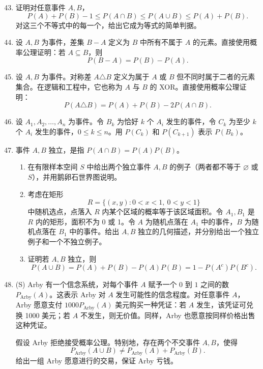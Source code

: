 \documentclass[UTF8,12pt,a4paper,fontset=fandol]{ctexart}
\begin{document}
\begin{enumerate}
  \setcounter{enumi}{42}
  \item 证明对任意事件 $A,B$，
  \[
    P(A)+P(B)-1\le P(A\cap B)\le P(A\cup B)\le P(A)+P(B).
  \]
  对这三个不等式中的每一个，给出它成为等式的简单判据。

  \item 设 $A,B$ 为事件，差集 $B-A$ 定义为 $B$ 中所有不属于 $A$ 的元素。直接使用概率公理证明：若 $A\subseteq B$，则
  \[
    P(B-A)=P(B)-P(A).
  \]

  \item 设 $A,B$ 为事件。对称差 $A\triangle B$ 定义为属于 $A$ 或 $B$ 但不同时属于二者的元素集合。在逻辑和工程中，它也称为 $A$ 与 $B$ 的 XOR。直接使用概率公理证明：
  \[
    P(A\triangle B)=P(A)+P(B)-2P(A\cap B).
  \]

  \item 设 $A_1,A_2,\ldots,A_n$ 为事件。令 $B_k$ 为恰好 $k$ 个 $A_i$ 发生的事件，令 $C_k$ 为至少 $k$ 个 $A_i$ 发生的事件，$0\le k\le n$。用 $P(C_k)$ 和 $P(C_{k+1})$ 表示 $P(B_k)$。

  \item 事件 $A,B$ 独立，是指 $P(A\cap B)=P(A)P(B)$。
  \begin{enumerate}
    \item 在有限样本空间 $S$ 中给出两个独立事件 $A,B$ 的例子（两者都不等于 $\varnothing$ 或 $S$），并用鹅卵石世界图说明。
    \item 考虑在矩形
    \[
      R=\{(x,y):0<x<1,\ 0<y<1\}
    \]
    中随机选点，点落入 $R$ 内某个区域的概率等于该区域面积。令 $A_1,B_1$ 是 $R$ 内的矩形，面积不为 0 或 1。令 $A$ 为随机点落在 $A_1$ 中的事件，$B$ 为随机点落在 $B_1$ 中的事件。给出 $A,B$ 独立的几何描述，并分别给出一个独立例子和一个不独立例子。
    \item 证明若 $A,B$ 独立，则
    \[
      P(A\cup B)=P(A)+P(B)-P(A)P(B)=1-P(A^c)P(B^c).
    \]
  \end{enumerate}

  \item (S) Arby 有一个信念系统，对每个事件 $A$ 赋予一个 $0$ 到 $1$ 之间的数 $P_{\text{Arby}}(A)$。这表示 Arby 对 $A$ 发生可能性的信念程度。对任意事件 $A$，Arby 愿意支付 $1000P_{\text{Arby}}(A)$ 美元购买一种凭证：若 $A$ 发生，该凭证可兑换 1000 美元；若 $A$ 不发生，则无价值。同样，Arby 也愿意按同样价格出售这种凭证。

  假设 Arby 拒绝接受概率公理。特别地，存在两个不交事件 $A,B$，使得
  \[
    P_{\text{Arby}}(A\cup B)\ne P_{\text{Arby}}(A)+P_{\text{Arby}}(B).
  \]
  给出一组 Arby 愿意进行的交易，保证 Arby 亏钱。
\end{enumerate}
\end{document}
